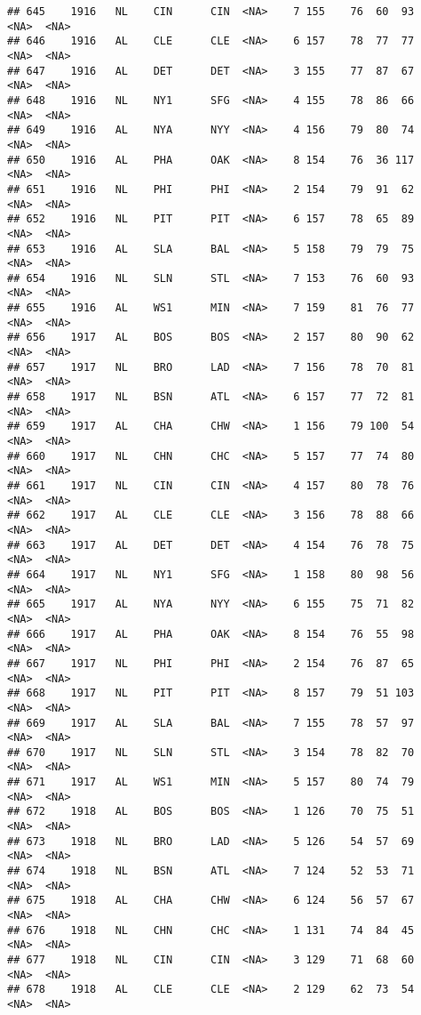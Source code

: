 \documentclass[]{article}
\begin{document}
\begin{verbatim}
## 645    1916   NL    CIN      CIN  <NA>    7 155    76  60  93   <NA>  <NA>
## 646    1916   AL    CLE      CLE  <NA>    6 157    78  77  77   <NA>  <NA>
## 647    1916   AL    DET      DET  <NA>    3 155    77  87  67   <NA>  <NA>
## 648    1916   NL    NY1      SFG  <NA>    4 155    78  86  66   <NA>  <NA>
## 649    1916   AL    NYA      NYY  <NA>    4 156    79  80  74   <NA>  <NA>
## 650    1916   AL    PHA      OAK  <NA>    8 154    76  36 117   <NA>  <NA>
## 651    1916   NL    PHI      PHI  <NA>    2 154    79  91  62   <NA>  <NA>
## 652    1916   NL    PIT      PIT  <NA>    6 157    78  65  89   <NA>  <NA>
## 653    1916   AL    SLA      BAL  <NA>    5 158    79  79  75   <NA>  <NA>
## 654    1916   NL    SLN      STL  <NA>    7 153    76  60  93   <NA>  <NA>
## 655    1916   AL    WS1      MIN  <NA>    7 159    81  76  77   <NA>  <NA>
## 656    1917   AL    BOS      BOS  <NA>    2 157    80  90  62   <NA>  <NA>
## 657    1917   NL    BRO      LAD  <NA>    7 156    78  70  81   <NA>  <NA>
## 658    1917   NL    BSN      ATL  <NA>    6 157    77  72  81   <NA>  <NA>
## 659    1917   AL    CHA      CHW  <NA>    1 156    79 100  54   <NA>  <NA>
## 660    1917   NL    CHN      CHC  <NA>    5 157    77  74  80   <NA>  <NA>
## 661    1917   NL    CIN      CIN  <NA>    4 157    80  78  76   <NA>  <NA>
## 662    1917   AL    CLE      CLE  <NA>    3 156    78  88  66   <NA>  <NA>
## 663    1917   AL    DET      DET  <NA>    4 154    76  78  75   <NA>  <NA>
## 664    1917   NL    NY1      SFG  <NA>    1 158    80  98  56   <NA>  <NA>
## 665    1917   AL    NYA      NYY  <NA>    6 155    75  71  82   <NA>  <NA>
## 666    1917   AL    PHA      OAK  <NA>    8 154    76  55  98   <NA>  <NA>
## 667    1917   NL    PHI      PHI  <NA>    2 154    76  87  65   <NA>  <NA>
## 668    1917   NL    PIT      PIT  <NA>    8 157    79  51 103   <NA>  <NA>
## 669    1917   AL    SLA      BAL  <NA>    7 155    78  57  97   <NA>  <NA>
## 670    1917   NL    SLN      STL  <NA>    3 154    78  82  70   <NA>  <NA>
## 671    1917   AL    WS1      MIN  <NA>    5 157    80  74  79   <NA>  <NA>
## 672    1918   AL    BOS      BOS  <NA>    1 126    70  75  51   <NA>  <NA>
## 673    1918   NL    BRO      LAD  <NA>    5 126    54  57  69   <NA>  <NA>
## 674    1918   NL    BSN      ATL  <NA>    7 124    52  53  71   <NA>  <NA>
## 675    1918   AL    CHA      CHW  <NA>    6 124    56  57  67   <NA>  <NA>
## 676    1918   NL    CHN      CHC  <NA>    1 131    74  84  45   <NA>  <NA>
## 677    1918   NL    CIN      CIN  <NA>    3 129    71  68  60   <NA>  <NA>
## 678    1918   AL    CLE      CLE  <NA>    2 129    62  73  54   <NA>  <NA>

\end{verbatim}
\end{document}

